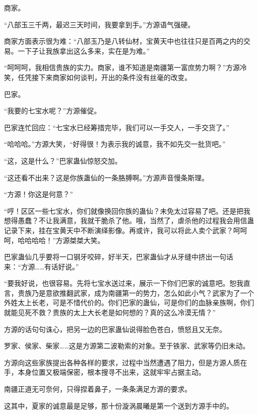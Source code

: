
\begin{this_body}



商家。

“八部玉三千两，最迟三天时间，我要拿到手。”方源语气强硬。

商家方面表示很为难：“八部玉乃是八转仙材，宝黄天中也往往只是百两之内的交易。一下子让我族拿出这么多来，实在是为难。”

“呵呵呵，我相信贵族的实力。商家，谁不知道是南疆第一富庶势力啊？”方源冷笑，任凭接下来商家如何谈判，开出的条件没有丝毫的改变。

巴家。

“我要的七宝水呢？”方源催促。

巴家连忙回应：“七宝水已经筹措完毕，我们可以一手交人，一手交货了。”

“哈哈哈。”方源大笑，“好得很！为表示我的诚意，我不如先交一批货吧。”

“这，这是什么？”巴家蛊仙惊怒交加。

“这还看不出来？这是你族蛊仙的一条胳膊啊。”方源声音慢条斯理。

“方源！你这是何意？”

“哼！区区一些七宝水，你们就像换回你族的蛊仙？未免太过容易了吧。还是把我想得愚蠢？不让我满意，我就干脆杀了他。哦，当然了，虐杀他的过程我会用信蛊记录下来，挂在宝黄天中不断演绎影像。再或许，我可以将此人卖个武家？呵呵呵，哈哈哈哈！”方源桀桀大笑。

巴家蛊仙几乎要将一口钢牙咬碎，好半天，巴家蛊仙才从牙缝中挤出一句话来：“方源……有话好说。”

“要我好说，也很容易。先将七宝水送过来，展示一下你们巴家的诚意吧。恕我直言，贵族乃是意欲推翻武家，成为南疆第一的势力，怎么如此小气？武家为了一个外姓太上长老，可是不惜代价的。你们巴家的蛊仙，可是你们的血脉亲族啊，你们就能见死不救？贵族的太上大长老是如何想的？真的这么冷漠无情？”

方源的话句句诛心，把另一边的巴家蛊仙说得脸色苍白，愤怒且又无奈。

罗家、侯家、柴家……这是方源第二波勒索的对象。至于铁家、武家等仍旧未动。

方源向这些家族提出各种各样的要求，过程中当然遭遇了阻力，但是方源人质在手，本身位置又极端保密，根本搜寻不出来，这就牢牢占据主动。

南疆正道无可奈何，只得捏着鼻子，一条条满足方源的要求。

这其中，夏家的诚意最是足够，那十份漩涡晨曦是第一个送到方源手中的。


\end{this_body}
